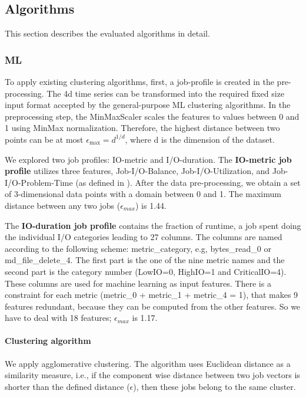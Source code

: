 \documentclass{jhps}
\makeatletter
\newcommand{\jk}[1]{\todo[inline]{JK:\@#1}}
\newcommand{\eb}[1]{\todo[inline, color=GreenYellow]{EB:\@#1}}
\makeatother
\begin{document}
\subsection{Algorithms}
This section describes the evaluated algorithms in detail.

\subsubsection{ML}

To apply existing clustering algorithms, first, a job-profile is created in the pre-processing.
The 4d time series can be transformed into the required fixed size input format accepted by the general-purpose ML clustering algorithms.
In the preprocessing step, the MinMaxScaler scales the features to values between 0 and 1 using MinMax normalization.
Therefore, the highest distance between two points can be at most \(\epsilon_\text{max} = d^{1/d}\), where d is the dimension of the dataset.

We explored two job profiles: IO-metric and I/O-duration.
The \textbf{IO-metric job profile} utilizes three features, Job-I/O-Balance, Job-I/O-Utilization, and Job-I/O-Problem-Time (as defined in \cite{iocats2020}).
After the data pre-processing, we obtain a set of 3-dimensional data points with a domain between 0 and 1.
The maximum distance between any two jobs ($\epsilon_{max}$) is 1.44.

The \textbf{IO-duration job profile} contains the fraction of runtime, a job spent doing the individual I/O categories leading to 27 columns.
The columns are named according to the following scheme: metric\_category, e.g, bytes\_read\_0 or md\_file\_delete\_4.
The first part is the one of the nine metric names and the second part is the category number (LowIO=0, HighIO=1 and CriticalIO=4).
These columns are used for machine learning as input features.
There is a constraint for each metric (metric\_0 + metric\_1 + metric\_4 = 1), that makes 9 features redundant, because they can be computed from the other features.
So we have to deal with 18 features; $\epsilon_{max}$ is 1.17.


\paragraph{Clustering algorithm}
We apply agglomerative clustering.
\jk{Könnte noch bissl unklar sein}
The algorithm uses Euclidean distance as a similarity measure, i.e., if the component wise distance between two job vectors is shorter than the defined distance ($\epsilon$), then these jobs belong to the same cluster.
\end{document}
